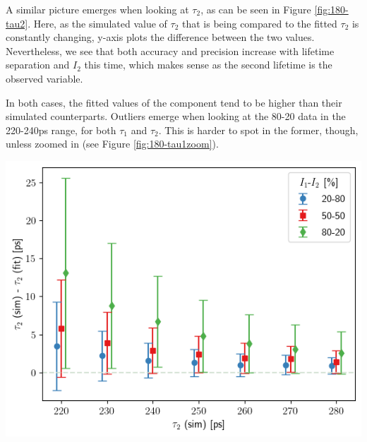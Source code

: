A similar picture emerges when looking at $\tau_2$, as can be seen in Figure \ref{fig:180-tau2}. Here, as the simulated value of $\tau_2$ that is being compared to the fitted $\tau_2$ is constantly changing, y-axis plots the difference between the two values. Nevertheless, we see that both accuracy and precision increase with lifetime separation and $I_2$ this time, which makes sense as the second lifetime is the observed variable.

In both cases, the fitted values of the component tend to be higher than their simulated counterparts. Outliers emerge when looking at the 80-20 data in the 220-240ps range, for both $\tau_1$ and $\tau_2$. This is harder to spot in the former, though, unless zoomed in (see Figure \ref{fig:180-tau1zoom}).

\vspace{0.5cm}
\begin{minipage}{.45\linewidth}
     
    \includegraphics[width=\linewidth]{Batch 1+2/Batch1+2/output/plotfin/t2.png}
    \label{fig:180-tau2}
\end{minipage}
\hfill
